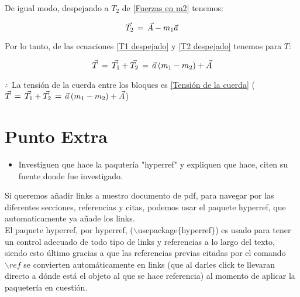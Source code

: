 \documentclass[letterpaper, 12pt]{article}
\begin{document}
\begin{enumerate}
    De igual modo, despejando a $T_{2}$ de \ref{Fuerzas en m2} tenemos: 
    
    \begin{equation}
        \label{T2 despejado}
        \vec{T_{2}} \thinspace = \thinspace \vec{A} - m_{1} \vec{a}
    \end{equation}
    
    Por lo tanto, de las ecuaciones \ref{T1 despejado} y \ref{T2 despejado} tenemos para $T$: 
    
    \begin{equation}
        \label{Tensión de la cuerda}
        \vec{T} \thinspace = \thinspace \vec{T_{1}} + \vec{T_{2}} \thinspace = \thinspace \vec{a} \left( m_{1} - m_{2} \right) + \vec{A}
    \end{equation}
    
    $\therefore$ \thinspace La tensión de la cuerda entre los bloques es \ref{Tensión de la cuerda} ($\vec{T} \thinspace = \thinspace \vec{T_{1}} + \vec{T_{2}} \thinspace = \thinspace \vec{a} \left( m_{1} - m_{2} \right) + \vec{A}$) \\
    
\section{Punto Extra}

    \begin{itemize}\renewcommand{\labelitemi}{$\propto$}
        \item Investiguen que hace la paqutería "hyperref" y expliquen que hace, citen su fuente donde fue investigado.\\
    \end{itemize}
    
    Si queremos añadir links a nuestro documento de pdf, para navegar por las diferentes secciones, referencias y citas, podemos usar el paquete {hyperref}, que automaticamente ya añade los links.\\
    
    El paquete hyperref, por hyperref, ($\backslash$usepackage$\{$hyperref$\}$) es usado para tener un control adecuado de todo tipo de links y referencias a lo largo del texto, siendo esto último gracias a que las referencias previas citadas por el comando $\backslash ref$  se convierten automáticamente en links (que al darles click te llevaran directo a dónde está el objeto al que se hace referencia) al momento de aplicar la paquetería en cuestión.\\
    

\end{enumerate}
\end{document}
